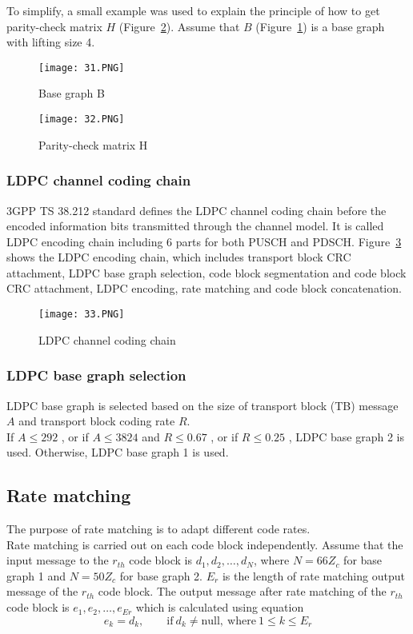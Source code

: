 To simplify, a small example was used to explain the principle of how to get parity-check matrix $H$ (Figure~\ref{fig:H parity}). Assume that $B$ (Figure~\ref{fig:B}) is a base graph with lifting size 4.

\begin{figure}[h]
\centering
\texttt{[image: 31.PNG]}
\caption{Base graph B}
\label{fig:B}
\end{figure}

\begin{figure}[h]
\centering
\texttt{[image: 32.PNG]}
\caption{Parity-check matrix H}
\label{fig:H parity}
\end{figure}

\subsubsection{LDPC channel coding chain}
3GPP TS 38.212 standard defines the LDPC channel coding chain before the encoded information bits transmitted through the channel model. It is called LDPC encoding chain including 6 parts for both PUSCH and PDSCH. Figure~\ref{fig:coding chain} shows the LDPC encoding chain, which includes transport block CRC attachment, LDPC base graph selection, code block segmentation and code block CRC attachment, LDPC encoding, rate matching and code block concatenation. 

\begin{figure}[h]
\centering
\texttt{[image: 33.PNG]}
\caption{LDPC channel coding chain}
\label{fig:coding chain}
\end{figure}

\subsubsection{LDPC base graph selection}
LDPC base graph is selected based on the size of transport block (TB) message $A$ and transport block coding rate $R$. \\
If $A \leq 292$ , or if $A \leq 3824$ and $R \leq 0.67$ , or if $R \leq 0.25$ , LDPC base graph 2 is used. 
Otherwise, LDPC base graph 1 is used.

\subsection{Rate matching}
The purpose of rate matching is to adapt different code rates. \\
Rate matching is carried out on each code block independently. Assume that the input message to the $r_{th}$ code block is $d_1, d_2, \ldots , d_N$, where $N = 66Z_c$ for base graph 1 and $N = 50Z_c$ for base graph 2. $E_r$ is the length of rate matching output message of the $r_{th}$ code block. The output message after rate matching of the $r_{th}$ code block is $e_1, e_2, \ldots , e_{Er}$ which is calculated using equation
\[e_k = d_k, \qquad \text{if}\ d_k \neq \text{null},\ \text{where}\  1 \leq k \leq E_r\] 

